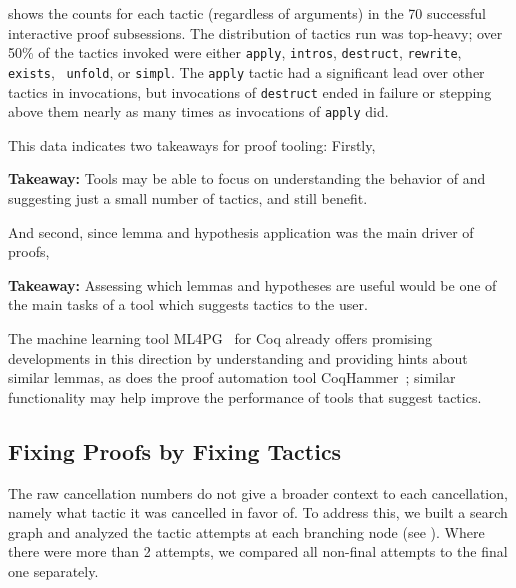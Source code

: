  shows the counts for each tactic
(regardless of arguments) in the 70 successful interactive proof subsessions.
The distribution of tactics run was top-heavy; over 50\% of the tactics
invoked were either \lstinline{apply}, \lstinline{intros},
\lstinline{destruct}, \lstinline{rewrite}, \lstinline{exists}, \
\lstinline{unfold}, or \lstinline{simpl}.
The \lstinline{apply} tactic had a significant lead over other tactics
in invocations, but invocations of \lstinline{destruct} ended in
failure or stepping above them nearly as many times as invocations
of \lstinline{apply} did.

This data indicates two takeaways for proof tooling:
Firstly,
\begin{displayquote}
  \textbf{Takeaway:}
  Tools may be able to focus on understanding the behavior of
  and suggesting just a small number of tactics,
  and still benefit.
\end{displayquote}
And second, since lemma and hypothesis application was the main driver of proofs,
\begin{displayquote}
  \textbf{Takeaway:}
  Assessing which lemmas and hypotheses are useful would be one of the main tasks of
  a tool which suggests tactics to the user.
\end{displayquote}
The machine learning tool ML4PG~\cite{Komendantskaya2012} for Coq
already offers promising developments in this direction by understanding
and providing hints about similar lemmas,
as does the proof automation tool CoqHammer~\cite{coqhammer};
similar functionality may help
improve the performance of tools that suggest tactics.

\subsection{Fixing Proofs by Fixing Tactics}
\label{sec:fixes}

The raw cancellation numbers do not give a
broader context to each cancellation, namely what tactic it was
cancelled in favor of. To address this, we built a search
graph and analyzed the tactic attempts at each branching node (see
\Cref{fig:search-tree}). Where there were more than 2 attempts, we
compared all non-final attempts to the final one separately.

